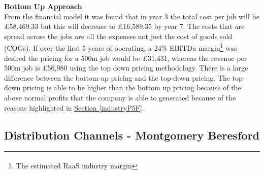 \documentclass[11pt]{article}		%
\newcommand{\supercite}[1]{\textsuperscript{\cite{#1}}}		%
\newcommand{\sectref}[1]{\hyperref[#1]{Section \ref*{#1}}}     %
\begin{document}
            
                        \textbf{Bottom Up Approach}
                        \\
            From the financial model it was found that in year 3 the total cost per job will be £58,469.33 but this will decrease to £16,589.35 by year 7. The costs that are spread across the jobs are all the expenses not just the cost of goods sold (COGs). If over the first 5 years of operating, a 24\% EBITDa margin\footnote{The estimated RaaS industry margin\supercite{RaaS}} was desired the pricing for a 500m job would be £31,431, whereas the revenue per 500m job is £56,980 using the top down pricing methodology. There is a large difference between the bottom-up pricing and the top-down pricing. The top-down pricing is able to be higher than the bottom up pricing because of the above normal profits that the company is able to generated because of the reasons highlighted in \sectref{industryP5F}.
            	            \\
        
       \subsection[Distribution Channels]{Distribution Channels - Montgomery Beresford}
	        
\end{document}
